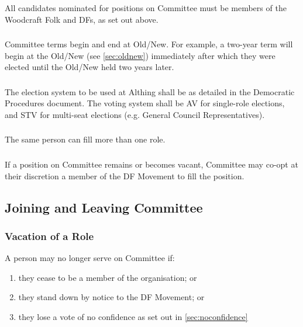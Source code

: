 \documentclass[a4paper, 11pt]{report}
\begin{document}
\subsubsection{}
All candidates nominated for positions on Committee must be members of the Woodcraft Folk and DFs, as set out above.

\subsubsection{}
Committee terms begin and end at Old/New.  For example, a two-year term will begin at the Old/New (see \ref{sec:oldnew}) immediately after which they were elected until the Old/New held two years later.

\subsubsection{}
The election system to be used at Althing shall be as detailed in the Democratic Procedures document.  The voting system shall be AV for single-role elections, and STV for multi-seat elections (e.g. General Council Representatives).

\subsubsection{}
\label{sec:moreroles}
The same person can fill more than one role.

\subsubsection{}
If a position on Committee remains or becomes vacant, Committee may co-opt at their discretion a member of the DF Movement to fill the position.

\subsection{Joining and Leaving Committee}
\label{sec:joiningleaving}

\subsubsection{Vacation of a Role}
A person may no longer serve on Committee if:
\begin{enumerate}[\hspace{0.5cm}(a)]
\item they cease to be a member of the organisation; or
\item they stand down by notice to the DF Movement; or
\item they lose a vote of no confidence as set out in \ref{sec:noconfidence}
\end{enumerate}
\end{document}
